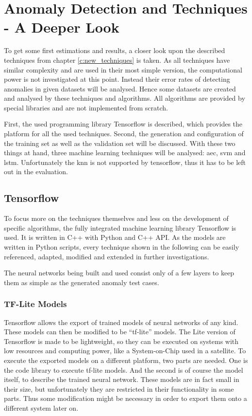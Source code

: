 \chapter{Anomaly Detection and Techniques - A Deeper Look}
\label{c:selection}
To get some first estimations and results, a closer look upon the described techniques from chapter \ref{c:new_techniques} is taken. As all techniques have similar complexity and are used in their most simple version, the computational power is not investigated at this point. Instead their error rates of detecting anomalies in given datasets will be analysed. Hence some datasets are created and analysed by these techniques and algorithms. All algorithms are provided by special libraries and are not implemented from scratch.

First, the used programming library Tensorflow \cite{tf-web} is described, which provides the platform for all the used techniques. Second, the generation and configuration of the training set as well as the validation set will be discussed. With these two things at hand, three machine learning techniques will be analysed: \ac{aec}, \ac{svm} and \ac{lstm}. Unfortunately the \ac{knn} is not supported by tensorflow, thus it has to be left out in the evaluation.

\section{Tensorflow}
To focus more on the techniques themselves and less on the development of specific algorithms, the fully integrated machine learning library Tensorflow \cite{tf-web} is used. It is written in C++ with Python and C++ API. As the models are written in Python scripts, every technique shown in the following can be easily referenced, adapted, modified and extended in further investigations.

The neural networks being built and used consist only of a few layers to keep them as simple as the generated anomaly test cases.

	\subsection{TF-Lite Models}
	Tensorflow allows the export of trained models of neural networks of any kind. These models can then be modified to be \enquote{tf-lite} models. The Lite version of Tensorflow is made to be lightweight, so they can be executed on systems with low resources and computing power, like a System-on-Chip used in a satellite. To execute the exported models on a different platform, two parts are needed. One is the code library to execute tf-lite models. And the second is of course the model itself, to describe the trained neural network. These models are in fact small in their size, but unfortunately they are restricted in their functionality in some parts. Thus some modification might be necessary in order to export them onto a different system later on. 

